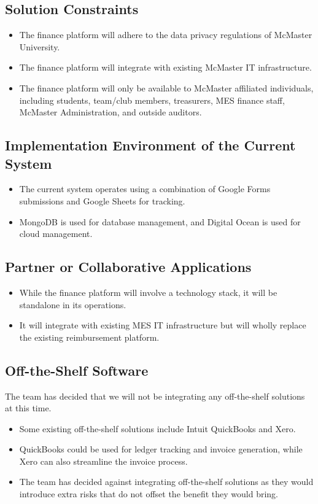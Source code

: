\documentclass[12pt]{article}
\begin{document}
\subsection{Solution Constraints}
\begin{itemize}
    \item The finance platform will adhere to the data privacy regulations of McMaster University.
    \item The finance platform will integrate with existing McMaster IT infrastructure.
    \item The finance platform will only be available to McMaster affiliated individuals, including students, team/club members, treasurers, MES finance staff, McMaster Administration, and outside auditors.
\end{itemize}

\subsection{Implementation Environment of the Current System}
\begin{itemize}
    \item The current system operates using a combination of Google Forms submissions and Google Sheets for tracking. 
    \item MongoDB is used for database management, and Digital Ocean is used for cloud management.
\end{itemize}

\subsection{Partner or Collaborative Applications}
\begin{itemize}
    \item While the finance platform will involve a technology stack, it will be standalone in its operations.
    \item It will integrate with existing MES IT infrastructure but will wholly replace the existing reimbursement platform.
\end{itemize}
 

\subsection{Off-the-Shelf Software}
The team has decided that we will not be integrating any off-the-shelf solutions at this time.

\begin{itemize}
    \item Some existing off-the-shelf solutions include Intuit QuickBooks and Xero.
    \item QuickBooks could be used for ledger tracking and invoice generation, while Xero can also streamline the invoice process.
    \item The team has decided against integrating off-the-shelf solutions as they would introduce extra risks that do not offset the benefit they would bring. 
\end{itemize}
 
\end{document}
